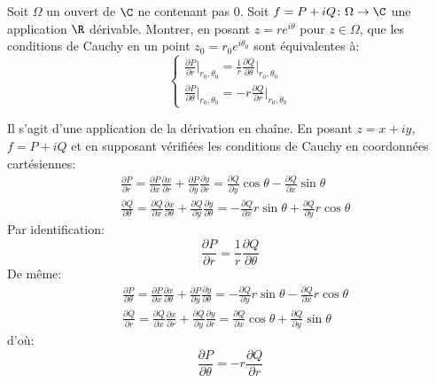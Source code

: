 \begin{fex}
Soit $\Omega$ un ouvert de $\C$ ne contenant pas $0.$ Soit $f=P + i Q \colon \Omega \to \C$ une application $\R$ dérivable. Montrer, en posant $z=re^{i\theta}$ pour $z \in \Omega$, que les conditions de Cauchy en un point $z_0 = r_0 e^{i \theta_0}$ sont équivalentes à:
\[
\begin{cases}
    \frac{\partial P}{\partial r}\vert_{r_0,\theta_0} = \frac{1}{r}\frac{\partial Q}{\partial \theta}\vert_{r_0,\theta_0} \\
    \frac{\partial P}{\partial \theta}\vert_{r_0,\theta_0} =- r\frac{\partial Q}{\partial r}\vert_{r_0,\theta_0}
\end{cases}
\]
\end{fex}
Il s'agit d'une application de la dérivation en chaîne. En posant $z = x + i y$, $f = P + i Q$ 
et en supposant vérifiées les conditions de Cauchy en coordonnées cartésiennes:
\begin{equation}
\begin{split}
    & \frac{\partial P}{\partial r} = \frac{\partial P}{\partial x}\frac{\partial x}{\partial r} +\frac{\partial P}{\partial y}\frac{\partial y}{\partial r}
    = \frac{\partial Q}{\partial y} \cos \theta -\frac{\partial Q}{\partial x} \sin \theta\\
    & \frac{\partial Q}{\partial \theta} = \frac{\partial Q}{\partial x}\frac{\partial x}{\partial \theta} + \frac{\partial Q}{\partial y}\frac{\partial y}{\partial \theta} = -\frac{\partial Q}{\partial x} r \sin\theta + \frac{\partial Q}{\partial y} r \cos \theta
\end{split}
\end{equation}
Par identification:
\[
\frac{\partial P}{\partial r} = \frac{1}{r}\frac{\partial Q}{\partial \theta}
\]
De même:
\begin{equation}
\begin{split}
    & \frac{\partial P}{\partial \theta} = \frac{\partial P}{\partial x}\frac{\partial x}{\partial \theta} +\frac{\partial P}{\partial y}\frac{\partial y}{\partial \theta}
    = - \frac{\partial Q}{\partial y} r \sin \theta -\frac{\partial Q}{\partial x} r \cos \theta\\
    & \frac{\partial Q}{\partial r} = \frac{\partial Q}{\partial x}\frac{\partial x}{\partial r} + \frac{\partial Q}{\partial y}\frac{\partial y}{\partial r} = \frac{\partial Q}{\partial x}  \cos \theta + \frac{\partial Q}{\partial y} \sin \theta
\end{split}
\end{equation}
d'où:
\[
\frac{\partial P}{\partial \theta} = -r \frac{\partial Q}{\partial r}
\]